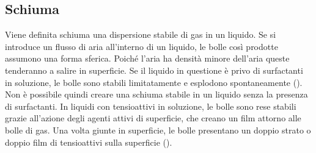 \subsection{Schiuma}
Viene definita schiuma una dispersione stabile di gas in un liquido. Se si introduce un flusso di aria all'interno di un liquido, le bolle così prodotte assumono una forma sferica. Poiché l'aria ha densità minore dell'aria queste tenderanno a salire in superficie. Se il liquido in questione è privo di surfactanti in soluzione, le bolle sono stabili limitatamente e esplodono spontaneamente (). Non è possibile quindi creare una schiuma stabile in un liquido senza la presenza di surfactanti. In liquidi con tensioattivi in soluzione, le bolle sono rese stabili grazie all'azione degli agenti attivi di superficie, che creano un film attorno alle bolle di gas. Una volta giunte in superficie, le bolle presentano un doppio strato o doppio film di tensioattivi sulla superficie ().

